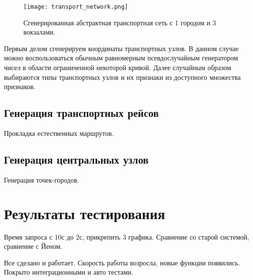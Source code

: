 \begin{figure}[!h]
	\centering
	\texttt{[image: transport\_network.png]}
	\caption{Сгенерированная абстрактная транспортная сеть с 1 городом и 3 вокзалами.}\label{fig1}
\end{figure}

Первым делом сгенерируем координаты транспортных узлов. В данном случае можно воспользоваться обычным равномерным псевдослучайным генератором чисел в области ограниченной некоторой кривой. Далее случайным образом выбираются типы транспортных узлов и их признаки из доступного множества признаков.

\subsection{Генерация транспортных рейсов}
Прокладка естественных маршрутов.
\subsection{Генерация центральных узлов}
Генерация точек-городов.

\FloatBarrier
\section{Результаты тестирования}
Время запроса с 10с до 2с, прикрепить 3 графика. Сравнение со старой системой, сравнение с Йеном.

\chapterconclusion
Все сделано и работает. Скорость работы возросла, новые функции появились. Покрыто интеграционными и авто тестами.
